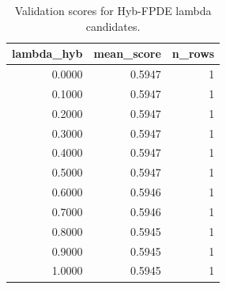 \begin{table}[t]
\caption{Validation scores for Hyb-FPDE lambda candidates.}
\label{tab:lambda_distribution_computed}
\centering
\begin{tabular}{rrr}
\toprule
lambda\_hyb & mean\_score & n\_rows \\
\midrule
0.0000 & 0.5947 & 1 \\
0.1000 & 0.5947 & 1 \\
0.2000 & 0.5947 & 1 \\
0.3000 & 0.5947 & 1 \\
0.4000 & 0.5947 & 1 \\
0.5000 & 0.5947 & 1 \\
0.6000 & 0.5946 & 1 \\
0.7000 & 0.5946 & 1 \\
0.8000 & 0.5945 & 1 \\
0.9000 & 0.5945 & 1 \\
1.0000 & 0.5945 & 1 \\
\bottomrule
\end{tabular}

\end{table}
